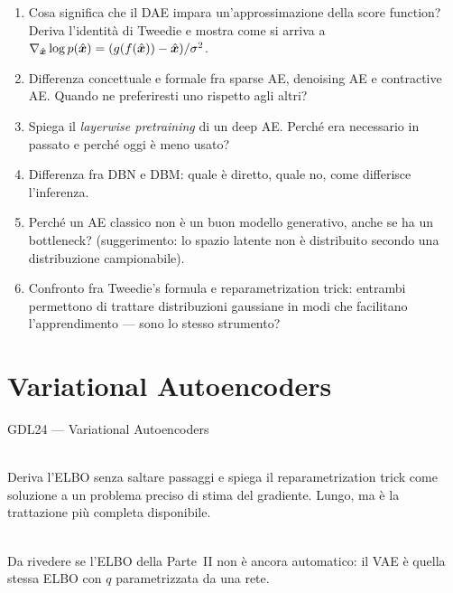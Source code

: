\begin{tcolorbox}[mywarn, title={Domande d'esame — Autoencoders}]
\begin{enumerate}
  \item Cosa significa che il DAE impara un'approssimazione della score function? Deriva l'identità di Tweedie e mostra come si arriva a $\nabla_{\hat{\bm{x}}} \log p(\hat{\bm{x}}) = (g(f(\hat{\bm{x}})) - \hat{\bm{x}})/\sigma^2$.
  \item Differenza concettuale e formale fra sparse AE, denoising AE e contractive AE. Quando ne preferiresti uno rispetto agli altri?
  \item Spiega il \emph{layerwise pretraining} di un deep AE. Perché era necessario in passato e perché oggi è meno usato?
  \item Differenza fra DBN e DBM: quale è diretto, quale no, come differisce l'inferenza.
  \item Perché un AE classico non è un buon modello generativo, anche se ha un bottleneck? (suggerimento: lo spazio latente non è distribuito secondo una distribuzione campionabile).
  \item Confronto fra Tweedie's formula e reparametrization trick: entrambi permettono di trattare distribuzioni gaussiane in modi che facilitano l'apprendimento — sono lo stesso strumento?
\end{enumerate}
\end{tcolorbox}

\chapter{Variational Autoencoders}

\begin{risorsevideo}{GDL24 — Variational Autoencoders}

\medskip
{}\\
Deriva l'ELBO senza saltare passaggi e spiega il reparametrization trick come soluzione a un problema preciso di stima del gradiente. Lungo, ma è la trattazione più completa disponibile.

\medskip
{}\\
Da rivedere se l'ELBO della Parte~II non è ancora automatico: il VAE è quella stessa ELBO con $q$ parametrizzata da una rete.
\end{risorsevideo}
\label{ch:vae}

